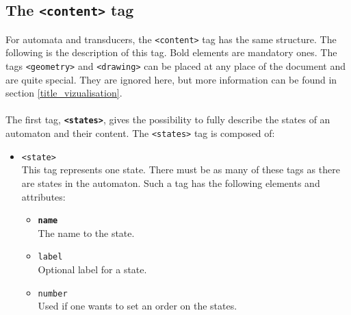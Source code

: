 \documentclass[a4paper]{llncs}
\def\contenttag{\texttt{<content>}}
\def\statestag{\texttt{<states>}}
\def\statetag{\texttt{<state>}}
\def\geometrytag{\texttt{<geometry>}}
\def\drawingtag{\texttt{<drawing>}}
\begin{document}
\subsection{The \contenttag{} tag}

For automata and transducers, the \contenttag{} tag has the same structure.
The following is the description of this tag. Bold elements are mandatory ones.
The tags \geometrytag{} and \drawingtag{} can be placed at any
place of the document and are quite special. They are ignored here, but more
information can be found in section \ref{title_vizualisation}.\\\\

The first tag, \textbf{\statestag{}}, gives the possibility to fully describe the states of an automaton
and their content. The \statestag{} tag is composed of:
\begin{itemize}
  \item \statetag{}\\
    This tag represents one state. There must be as many of these tags as there are states
in the automaton. Such a tag has the following elements and attributes:
\begin{itemize}
  \item \texttt{\textbf{name}}\\
    The name to the state.
  \item \texttt{label}\\
    Optional label for a state.
  \item \texttt{number}\\
    Used if one wants to set an order on the states.~\\
\end{itemize}
\end{itemize}
\end{document}
